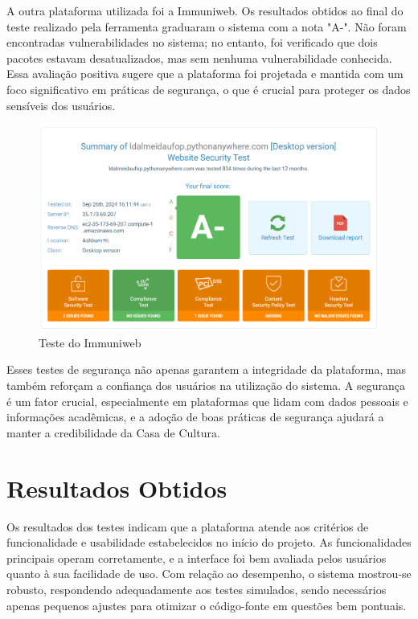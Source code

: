 A outra plataforma utilizada foi a Immuniweb. Os resultados obtidos ao final do teste realizado pela ferramenta graduaram o sistema com a nota "A-". Não foram encontradas vulnerabilidades no sistema; no entanto, foi verificado que dois pacotes estavam desatualizados, mas sem nenhuma vulnerabilidade conhecida. Essa avaliação positiva sugere que a plataforma foi projetada e mantida com um foco significativo em práticas de segurança, o que é crucial para proteger os dados sensíveis dos usuários.

\begin{figure}[htb] \caption{\label{fig_grafico}Teste do Immuniweb} \begin{center} \includegraphics[scale=0.3]{./img/immuniweb.png} \end{center}  \end{figure}

Esses testes de segurança não apenas garantem a integridade da plataforma, mas também reforçam a confiança dos usuários na utilização do sistema. A segurança é um fator crucial, especialmente em plataformas que lidam com dados pessoais e informações acadêmicas, e a adoção de boas práticas de segurança ajudará a manter a credibilidade da Casa de Cultura.

\section{Resultados Obtidos}


Os resultados dos testes indicam que a plataforma atende aos critérios de funcionalidade e usabilidade estabelecidos no início do projeto. As funcionalidades principais operam corretamente, e a interface foi bem avaliada pelos usuários quanto à sua facilidade de uso. Com relação ao desempenho, o sistema mostrou-se robusto, respondendo adequadamente aos testes simulados, sendo necessários apenas pequenos ajustes para otimizar o código-fonte em questões bem pontuais.

